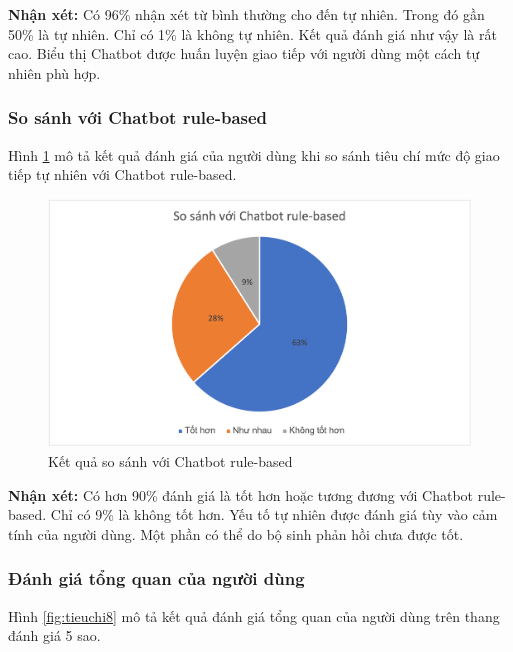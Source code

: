 \textbf{Nhận xét:}
Có 96\% nhận xét từ bình thường cho đến tự nhiên. Trong đó gần 50\%
là tự nhiên. Chỉ có 1\% là không tự nhiên. Kết quả đánh giá như vậy
là rất cao. Biểu thị Chatbot được huấn luyện giao tiếp với người dùng
một cách tự nhiên phù hợp.

\subsubsection{So sánh với Chatbot rule-based}
Hình \ref{fig:tieuchi72} mô tả kết quả đánh giá của người dùng khi
so sánh tiêu chí mức độ giao tiếp tự nhiên với Chatbot rule-based.

\begin{figure}[ht!]
    \centering
    \includegraphics[scale=0.91]{thesis/chatbot/ketqua/img/tieuchi7_2.png}
    \caption{Kết quả so sánh với Chatbot rule-based}
    \label{fig:tieuchi72}
\end{figure}

\textbf{Nhận xét:}
Có hơn 90\% đánh giá là tốt hơn hoặc tương đương với Chatbot rule-based.
Chỉ có 9\% là không tốt hơn. Yếu tố tự nhiên được đánh giá tùy vào
cảm tính của người dùng. Một phần có thể do bộ sinh phản hồi
chưa được tốt.

\subsubsection{Đánh giá tổng quan của người dùng}
Hình \ref{fig:tieuchi8} mô tả kết quả đánh giá tổng quan của người dùng
trên thang đánh giá 5 sao.

